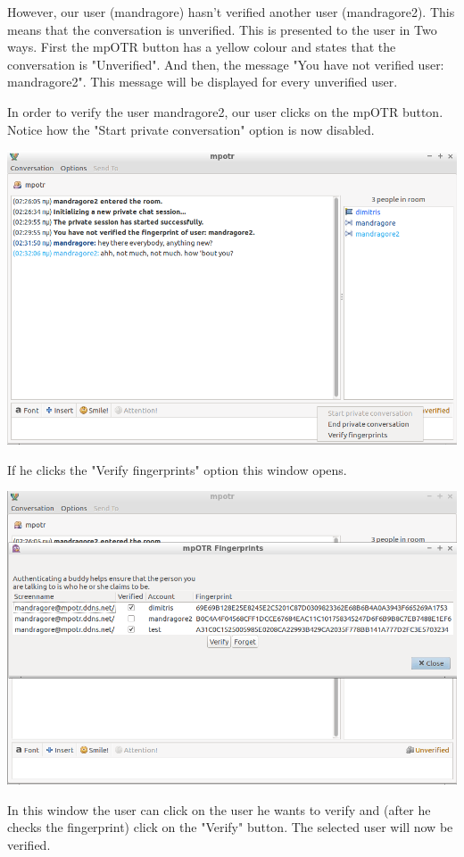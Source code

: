 \documentclass[]{article}
\begin{document}
However, our user (mandragore) hasn't verified another user (mandragore2).
This means that the conversation is unverified.
This is presented to the user in Two ways.
First the mpOTR button has a yellow colour and states that the conversation is "Unverified".
And then, the message "You have not verified user: mandragore2".
This message will be displayed for every unverified user.

In order to verify the user mandragore2, our user clicks on the mpOTR button.
Notice how the "Start private conversation" option is now disabled.

\includegraphics[scale=0.4]{click_mpotr_button_unverified.png}

If he clicks the "Verify fingerprints" option this window opens.

\includegraphics[scale=0.4]{verification_ui_opened_unverified.png}

In this window the user can click on the user he wants to verify and (after he checks the fingerprint) click on the "Verify" button.
The selected user will now be verified.
\end{document}
